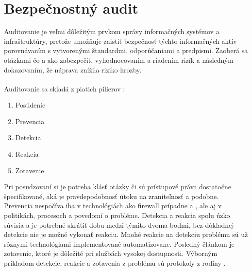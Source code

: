 \chapter{Bezpečnostný audit}
{}

Auditovanie je veľmi dôležitým prvkom správy informačných systémov a infraštruktúry, pretože umožňuje zaistiť bezpečnosť týchto informačných aktív porovnávaním s vytvorenými štandardmi, odporúčaniami a predpismi. Zaoberá sa otázkami čo a ako zabezpečiť, vyhodnocovaním a riadením rizík a následným dokazovaním, že náprava znížila riziko hrozby.
\\\\
\noindent
Auditovanie sa skladá z piatich pilierov \cite{Jackson2010}:

\begin{enumerate}
	\item Posúdenie
	\item Prevencia
	\item Detekcia
	\item Reakcia
	\item Zotavenie
\end{enumerate}

\vspace{1em}
\noindent
Pri posudzovaní si je potreba klásť otázky či sú prístupové práva dostatočne špecifikované, aká je pravdepodobnosť útoku na zraniteľnosť a podobne. Prevencia nespočíva iba v technológiách ako firewall prípadne  a , ale aj v politikách, procesoch a povedomí o probléme. Detekcia a reakcia spolu úzko súvisia a je potrebné skrátiť dobu medzi týmito dvoma bodmi, bez dôkladnej detekcie nie je možné vykonať reakciu.	Mnohé reakcie na detekciu problému sú už rôznymi technológiami implementované automatizovane. Posledný článkom je zotavenie, ktoré je dôležité pri službách vysokej dostupnosti. Výborným príkladom detekcie, reakcie a zotavenia z problému sú protokoly z rodiny .

